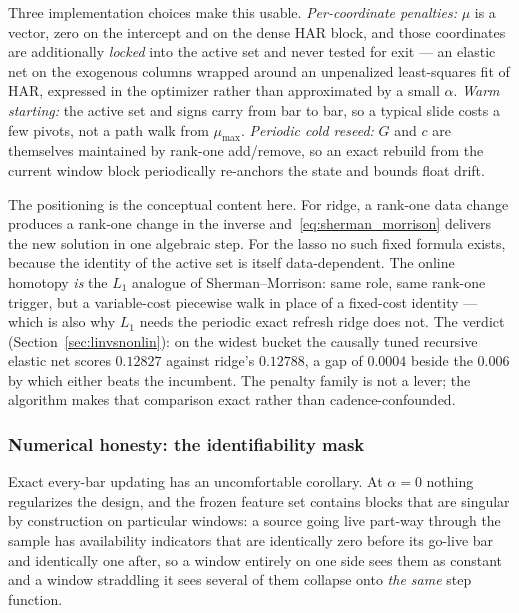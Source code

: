 Three implementation choices make this usable. \emph{Per-coordinate penalties:}
$\mu$ is a vector, zero on the intercept and on the dense HAR block, and those
coordinates are additionally \emph{locked} into the active set and never tested for
exit --- an elastic net on the exogenous columns wrapped around an unpenalized
least-squares fit of HAR, expressed in the optimizer rather than approximated by a
small $\alpha$. \emph{Warm starting:} the active set and signs carry from bar to
bar, so a typical slide costs a few pivots, not a path walk from $\mu_{\max}$.
\emph{Periodic cold reseed:} $G$ and $c$ are themselves maintained by rank-one
add/remove, so an exact rebuild from the current window block periodically
re-anchors the state and bounds float drift.

The positioning is the conceptual content here. For ridge, a rank-one data change
produces a rank-one change in the inverse and~\eqref{eq:sherman_morrison} delivers
the new solution in one algebraic step. For the lasso no such fixed formula exists,
because the identity of the active set is itself data-dependent. The online
homotopy \emph{is} the $L_1$ analogue of Sherman--Morrison: same role, same
rank-one trigger, but a variable-cost piecewise walk in place of a fixed-cost
identity --- which is also why $L_1$ needs the periodic exact refresh ridge does
not. The verdict (Section~\ref{sec:linvsnonlin}): on the widest bucket the causally
tuned recursive elastic net scores $0.12827$ against ridge's $0.12788$, a gap of
$0.0004$ beside the $0.006$ by which either beats the incumbent. The penalty family
is not a lever; the algorithm makes that comparison exact rather than
cadence-confounded.

\subsubsection{Numerical honesty: the identifiability mask}
\label{sec:alg_mask}

Exact every-bar updating has an uncomfortable corollary. At $\alpha = 0$ nothing
regularizes the design, and the frozen feature set contains blocks that are
singular by construction on particular windows: a source going live part-way
through the sample has availability indicators that are identically zero before its
go-live bar and identically one after, so a window entirely on one side sees them
as constant and a window straddling it sees several of them collapse onto
\emph{the same} step function.

